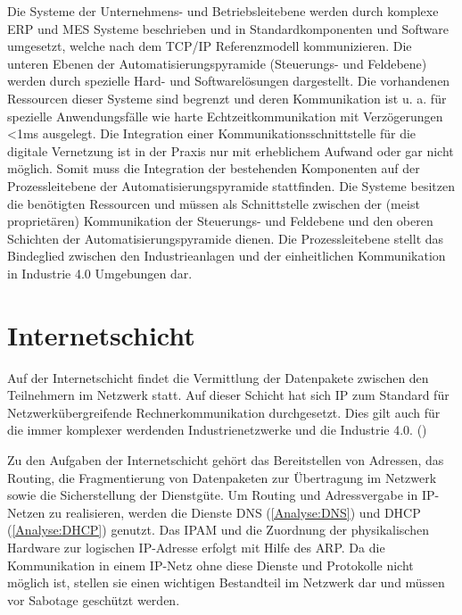 Die Systeme der Unternehmens- und Betriebsleitebene werden durch komplexe \ac{ERP} und \ac{MES} Systeme beschrieben und in Standardkomponenten und Software umgesetzt, welche nach dem \ac{TCP}/\ac{IP} Referenzmodell kommunizieren. Die unteren Ebenen der Automatisierungspyramide (Steuerungs- und Feldebene) werden durch spezielle Hard- und Softwarelösungen dargestellt. Die vorhandenen Ressourcen dieser Systeme sind begrenzt und deren Kommunikation ist u. a. für spezielle Anwendungsfälle wie harte Echtzeitkommunikation mit Verzögerungen <1ms ausgelegt. Die Integration einer Kommunikationsschnittstelle für die digitale Vernetzung ist in der Praxis nur mit erheblichem Aufwand oder gar nicht möglich. Somit muss die Integration der bestehenden Komponenten auf der Prozessleitebene der Automatisierungspyramide stattfinden. Die Systeme besitzen die benötigten Ressourcen und müssen als Schnittstelle zwischen der (meist proprietären) Kommunikation der Steuerungs- und Feldebene und den oberen Schichten der Automatisierungspyramide dienen. Die Prozessleitebene stellt das Bindeglied zwischen den Industrieanlagen und der einheitlichen Kommunikation in Industrie 4.0 Umgebungen dar. 

\section{Internetschicht}
Auf der Internetschicht findet die Vermittlung der Datenpakete zwischen den Teilnehmern im Netzwerk statt. Auf dieser Schicht hat sich \ac{IP} zum Standard für Netzwerkübergreifende Rechnerkommunikation durchgesetzt. Dies gilt auch für die immer komplexer werdenden Industrienetzwerke und die Industrie 4.0. (\cite{meinel2011})

Zu den Aufgaben der Internetschicht gehört das Bereitstellen von Adressen, das Routing, die Fragmentierung von Datenpaketen zur Übertragung im Netzwerk sowie die Sicherstellung der Dienstgüte. Um Routing und Adressvergabe in \ac{IP}-Netzen zu realisieren, werden die Dienste \ac{DNS} (\autoref{Analyse:DNS}) und \ac{DHCP} (\autoref{Analyse:DHCP}) genutzt. Das \ac{IPAM} und die Zuordnung der physikalischen Hardware zur logischen \ac{IP}-Adresse erfolgt mit Hilfe des \ac{ARP}. Da die Kommunikation in einem \ac{IP}-Netz ohne diese Dienste und Protokolle nicht möglich ist, stellen sie einen wichtigen Bestandteil im Netzwerk dar und müssen vor Sabotage geschützt werden.

